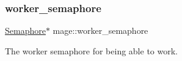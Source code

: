 \subsubsection{\texorpdfstring{worker\+\_\+semaphore}{worker\_semaphore}}
{\footnotesize\ttfamily \hyperlink{classmage_1_1_semaphore}{Semaphore}$\ast$ mage\+::worker\+\_\+semaphore\hspace{0.3cm}{\ttfamily [static]}}

The worker semaphore for being able to work. 